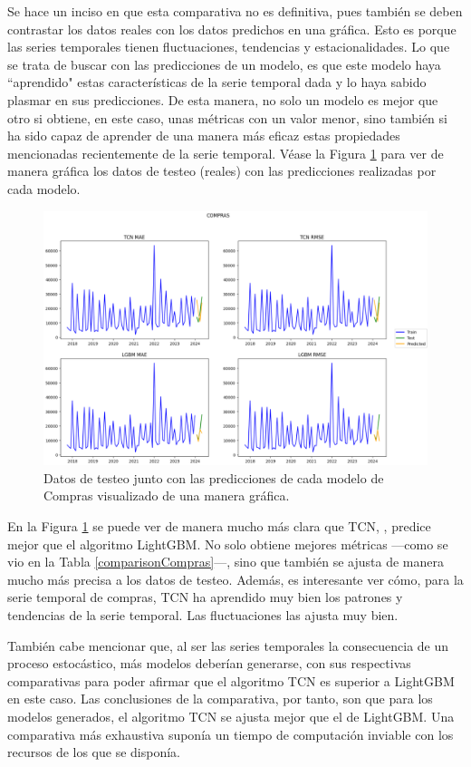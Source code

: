 Se hace un inciso en que esta comparativa no es definitiva, pues también se deben contrastar los datos reales con los datos predichos en una gráfica. Esto es porque  las series temporales tienen fluctuaciones, tendencias y estacionalidades. Lo que se trata de buscar con las predicciones de un modelo, es que este modelo haya ``aprendido" estas características de la serie temporal dada y lo haya sabido plasmar en sus predicciones. De esta manera, no solo un modelo es mejor que otro si obtiene, en este caso, unas métricas con un valor menor, sino también si ha sido capaz de aprender de una manera más eficaz estas propiedades mencionadas recientemente de la serie temporal.
Véase la Figura \ref{comparativaCompras} para ver de manera gráfica los datos de testeo (reales) con las predicciones realizadas por cada modelo.

\begin{figure}[H]
	\centering
	\includegraphics[scale = 0.5]{imgs/comparativaCompras}
	\caption{Datos de testeo junto con las predicciones de cada modelo de Compras visualizado de una manera gráfica.}
	\label{comparativaCompras}
\end{figure}

En la Figura \ref{comparativaCompras} se puede ver de manera mucho más clara que TCN, , predice mejor que el algoritmo LightGBM. No solo obtiene mejores métricas ---como se vio en la Tabla \ref{comparisonCompras}---, sino que también se ajusta de manera mucho más precisa a los datos de testeo. Además, es interesante ver cómo, para la serie temporal de compras, TCN ha aprendido muy bien los patrones y tendencias de la serie temporal. Las fluctuaciones las ajusta muy bien.

También cabe mencionar que, al ser las series temporales la consecuencia de un proceso estocástico, más modelos deberían generarse, con sus respectivas comparativas para poder afirmar que el algoritmo TCN es superior a LightGBM en este caso. Las conclusiones de la comparativa, por tanto, son que para los modelos generados, el algoritmo TCN se ajusta mejor que el de LightGBM. Una comparativa más exhaustiva suponía un tiempo de computación inviable con los recursos de  los que se disponía.

